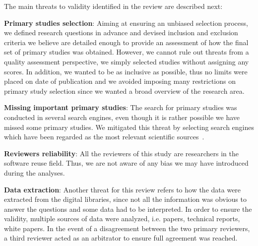 The main threats to validity identified in the review are described next:

\textbf{Primary studies selection}: Aiming at ensuring an unbiased selection process, we defined research questions in advance and devised inclusion and exclusion criteria we believe are detailed enough to provide an assessment of how the final set of primary studies was obtained. However, we cannot rule out threats from a quality assessment perspective, we simply selected studies without assigning any scores. In addition, we wanted to be as inclusive as possible, thus no limits were placed on date of publication and we avoided imposing many restrictions on primary study selection since we wanted a broad overview of the research area. 

\textbf{Missing important primary studies}: The search for primary studies was conducted in several search engines, even though it is rather possible we have missed some primary studies. We mitigated this threat by selecting search engines which have been regarded as the most relevant scientific sources~\cite{Kitchenham}. 

\textbf{Reviewers reliability}: All the reviewers of this study are researchers in the software reuse field. Thus, we are not aware of any bias we may have introduced during the analyses.

 \textbf{Data extraction}: Another threat for this review refers to how the data were extracted from the digital libraries, since not all the information was obvious to answer the questions and some data had to be interpreted. In order to ensure the validity, multiple sources of data were analyzed, i.e. papers, technical reports, white papers. In the event of a disagreement between the two primary reviewers, a third reviewer acted as an arbitrator to ensure full agreement was reached.